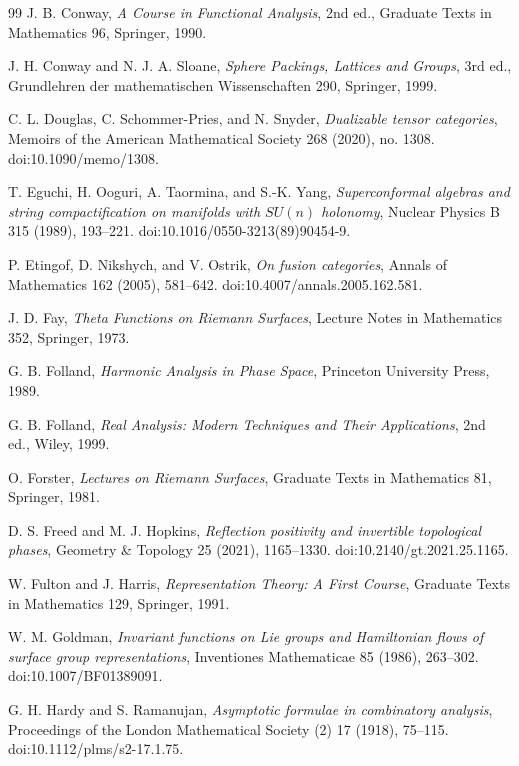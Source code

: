 \documentclass[11pt]{article}
\theoremstyle{definition}
\begin{document}
\begin{thebibliography}{99}
J. B. Conway,
\emph{A Course in Functional Analysis}, 2nd ed.,
Graduate Texts in Mathematics 96, Springer, 1990.

J. H. Conway and N. J. A. Sloane,
\emph{Sphere Packings, Lattices and Groups}, 3rd ed.,
Grundlehren der mathematischen Wissenschaften 290, Springer, 1999.

C. L. Douglas, C. Schommer-Pries, and N. Snyder,
\emph{Dualizable tensor categories},
Memoirs of the American Mathematical Society 268 (2020), no. 1308.
doi:10.1090/memo/1308.

T. Eguchi, H. Ooguri, A. Taormina, and S.-K. Yang,
\emph{Superconformal algebras and string compactification on manifolds
with $SU(n)$ holonomy},
Nuclear Physics B 315 (1989), 193--221.
doi:10.1016/0550-3213(89)90454-9.

P. Etingof, D. Nikshych, and V. Ostrik,
\emph{On fusion categories},
Annals of Mathematics 162 (2005), 581--642.
doi:10.4007/annals.2005.162.581.

J. D. Fay,
\emph{Theta Functions on Riemann Surfaces},
Lecture Notes in Mathematics 352, Springer, 1973.

G. B. Folland,
\emph{Harmonic Analysis in Phase Space},
Princeton University Press, 1989.

G. B. Folland,
\emph{Real Analysis: Modern Techniques and Their Applications}, 2nd ed.,
Wiley, 1999.

O. Forster,
\emph{Lectures on Riemann Surfaces},
Graduate Texts in Mathematics 81, Springer, 1981.

D. S. Freed and M. J. Hopkins,
\emph{Reflection positivity and invertible topological phases},
Geometry \& Topology 25 (2021), 1165--1330.
doi:10.2140/gt.2021.25.1165.

W. Fulton and J. Harris,
\emph{Representation Theory: A First Course},
Graduate Texts in Mathematics 129, Springer, 1991.

W. M. Goldman,
\emph{Invariant functions on Lie groups and Hamiltonian flows of surface
group representations},
Inventiones Mathematicae 85 (1986), 263--302.
doi:10.1007/BF01389091.

G. H. Hardy and S. Ramanujan,
\emph{Asymptotic formulae in combinatory analysis},
Proceedings of the London Mathematical Society (2) 17 (1918), 75--115.
doi:10.1112/plms/s2-17.1.75.


\end{thebibliography}
\end{document}
